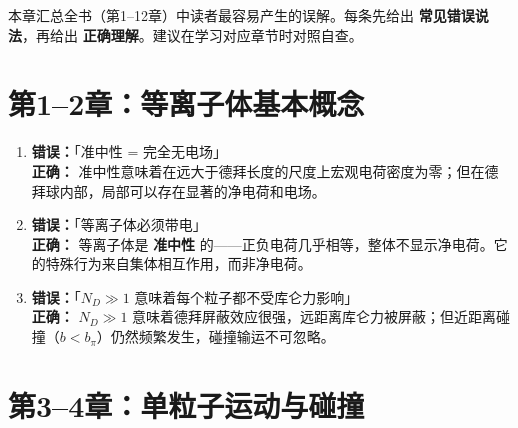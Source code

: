 \documentclass[12pt,a4paper,openany,oneside]{book}
\begin{document}
本章汇总全书（第1--12章）中读者最容易产生的误解。每条先给出 \textbf{常见错误说法}，再给出 \textbf{正确理解}。建议在学习对应章节时对照自查。


\section{第1--2章：等离子体基本概念}

\begin{warning}{}{}
\begin{enumerate}
\item \textbf{错误：}「准中性 = 完全无电场」\\
\textbf{正确：} 准中性意味着在远大于德拜长度的尺度上宏观电荷密度为零；但在德拜球内部，局部可以存在显著的净电荷和电场。

\item \textbf{错误：}「等离子体必须带电」\\
\textbf{正确：} 等离子体是 \textbf{准中性} 的——正负电荷几乎相等，整体不显示净电荷。它的特殊行为来自集体相互作用，而非净电荷。

\item \textbf{错误：}「$N_D\gg 1$ 意味着每个粒子都不受库仑力影响」\\
\textbf{正确：} $N_D\gg 1$ 意味着德拜屏蔽效应很强，远距离库仑力被屏蔽；但近距离碰撞（$b<b_\pi$）仍然频繁发生，碰撞输运不可忽略。
\end{enumerate}
\end{warning}


\section{第3--4章：单粒子运动与碰撞}
\end{document}
